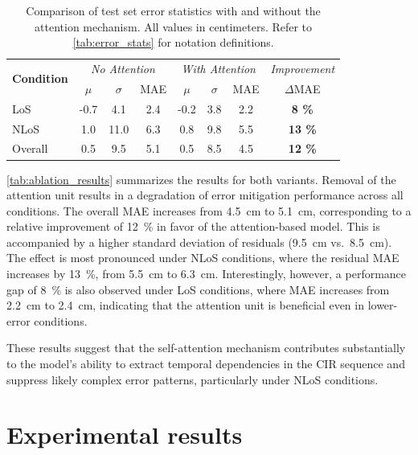 \begin{table}[tbh]
\centering
\caption[Error statistics with and without the attention mechanism.]{Comparison of test set error statistics with and without the attention mechanism. All values in centimeters. Refer to \autoref{tab:error_stats} for notation definitions.}
\label{tab:ablation_results}
\begin{tabular}{lccc|ccc|c}
\toprule
\multirow{2}{*}{\textbf{Condition}} &
\multicolumn{3}{c|}{\textit{No Attention}} &
\multicolumn{3}{c|}{\textit{With Attention}} &
\textit{Improvement} \\
& $\mu$ & $\sigma$ & MAE & $\mu$ & $\sigma$ & MAE & $\Delta$MAE \\
\midrule
LoS     & -0.7 & 4.1  & 2.4 & -0.2 & 3.8 & 2.2 & \textbf{8 \%} \\
NLoS    & 1.0  & 11.0 & 6.3 & 0.8  & 9.8 & 5.5 & \textbf{13 \%} \\
Overall & 0.5  & 9.5  & 5.1 & 0.5  & 8.5 & 4.5 & \textbf{12 \%} \\
\bottomrule
\end{tabular}
\end{table}

\autoref{tab:ablation_results} summarizes the results for both variants. Removal of the attention unit results in a degradation of error mitigation performance across all conditions. The overall MAE increases from \SI{4.5}{\centi\metre} to \SI{5.1}{\centi\metre}, corresponding to a relative improvement of \SI{12}{\percent} in favor of the attention-based model. This is accompanied by a higher standard deviation of residuals (\SI{9.5}{\centi\metre} vs.\ \SI{8.5}{\centi\metre}). The effect is most pronounced under NLoS conditions, where the residual MAE increases by \SI{13}{\percent}, from \SI{5.5}{\centi\metre} to \SI{6.3}{\centi\metre}. Interestingly, however, a performance gap of \SI{8}{\percent} is also observed under LoS conditions, where MAE increases from \SI{2.2}{\centi\metre} to \SI{2.4}{\centi\metre}, indicating that the attention unit is beneficial even in lower-error conditions.

These results suggest that the self-attention mechanism contributes substantially to the model's ability to extract temporal dependencies in the CIR sequence and suppress likely complex error patterns, particularly under NLoS conditions.


\section{Experimental results}

